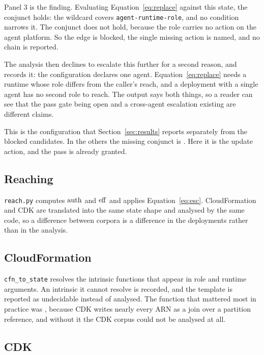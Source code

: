 Panel 3 is the finding. Evaluating Equation~\ref{eq:replace} against this
state, the  conjunct holds: the wildcard covers
\texttt{agent-runtime-role}, and no condition narrows it. The
 conjunct does not hold, because the role carries no
action on the agent platform. So the edge is blocked, the single missing
action is named, and no chain is reported.

The analysis then declines to escalate this further for a second reason, and
records it: the configuration declares one agent. Equation~\ref{eq:replace}
needs a runtime whose role differs from the caller's reach, and a deployment
with a single agent has no second role to reach. The output says both things,
so a reader can see that the pass gate being open and a cross-agent
escalation existing are different claims.

This is the \nPassRoleWide configuration that Section~\ref{sec:results}
reports separately from the \nBlocked blocked candidates. In the others the
missing conjunct is . Here it is the update action, and the
pass is already granted.

\subsection{Reaching}

\texttt{reach.py} computes $\mathrm{auth}$ and $\mathrm{eff}$ and applies
Equation~\ref{eq:esc}. CloudFormation and CDK are translated into the same state shape and analysed
by the same code, so a difference between corpora is a difference in the
deployments rather than in the analysis.

\subsection{CloudFormation}

\texttt{cfn\_to\_state} resolves the intrinsic functions that appear in role
and runtime arguments. An intrinsic it cannot resolve is recorded, and the
template is reported as undecidable instead of analysed. The function that
mattered most in practice was , because CDK writes nearly every
ARN as a join over a partition reference, and without it the CDK corpus could
not be analysed at all.

\subsection{CDK}

